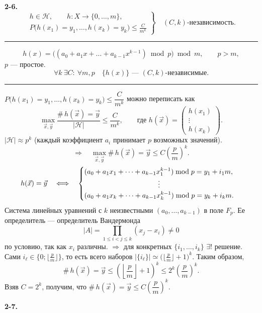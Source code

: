 \documentclass[a4paper,11pt]{article}
\begin{document}
{\large\bfseries 2-6.}
\[
	\left.
	\begin{gathered}
		h\in\mathcal{H},\qquad h\colon X\to\{0,\dots,m\}, \\
		P\bigl(h(x_1)=y_1,\dots,h(x_k)=y_k\bigr)\leq\frac{C}{m^k}
	\end{gathered}
	\right\}\quad (C,k)\text{-независимость}.
\]
\hrule
\[
	h(x)=\bigl((a_0+a_1x+\dots+a_{k-1}x^{k-1})\bmod p\bigr)\bmod m,
	\qquad p>m,
\]
$p$ --- простое.
\[
	\forall k\ \exists C\colon\ \forall m,p\quad\{h(x)\}\text{ --- $(C,k)$-независимые}.
\]
\hrule
\medskip
$P\bigl(h(x_1)=y_1,\dots,h(x_k)=y_k\bigr)\leq\dfrac{C}{m^k}$ можно переписать как
\[
	\max_{\vec{x},\vec{y}}\frac{\#\,h(\vec{x})=\vec{y}}{|\mathcal{H}|}
	\leq\frac{C}{m^k},
	\qquad\text{где } h(\vec{x})=\begin{pmatrix}h(x_1)\\\vdots\\h(x_k)\end{pmatrix}.
\]
$|\mathcal{H}|\approx p^k$ (каждый коэффициент $a_i$ принимает $p$ возможных значений).
\[
	\Rightarrow\quad\max_{\vec{x},\vec{y}}\#\,h(\vec{x})=\vec{y}
	\leq C{\left(\frac{p}{m}\right)}^k.
\]
\[
	h(\vec{x})=\vec{y}\quad\Longleftrightarrow\quad
	\begin{cases}
		(a_0+a_1x_1+\dots+a_{k-1}x_1^{k-1})\bmod p=y_1+i_1m, \\
		\hfill\vdots\hfill                                   \\
		(a_0+a_1x_k+\dots+a_{k-1}x_k^{k-1})\bmod p=y_k+i_k m.
	\end{cases}
\]
Система линейных уравнений с $k$ неизвестными $(a_0,\dots,a_{k-1})$ в поле $F_p$.
Ее определитель --- определитель Вандермонда
\[
	|A|=\prod_{1\leq i<j\leq k}(x_j-x_i)\ne 0
\]
по условию, так как $x_i$ различны.
$\Rightarrow$ для конкретных $\{i_1,\dots,i_k\}$ $\exists!$ решение. %
Сами $i_\ell\in\bigl\{0;\lfloor\frac{p}{m}\rfloor\bigr\}$,
то есть всего наборов $|\{i_\ell\}|\simeq{\bigl(\lfloor\frac{p}{m}\rfloor+1\bigr)}^k$.
Таким образом,
\[
	\#\,h(\vec{x})=\vec{y}\leq{\left(\left\lfloor\frac{p}{m}\right\rfloor+1\right)}^k
	\leq 2^k{\left(\frac{p}{m}\right)}^k.
\]
Взяв $C=2^k$, получим, что $\#\,h(\vec{x})=\vec{y}\leq C{\left(\dfrac{p}{m}\right)}^k$.

\newpage

{\large\bfseries 2-7.}
\end{document}
